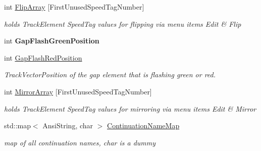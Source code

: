 \begin{DoxyCompactItemize}
\mbox{\label{class_t_track_aa64b2f90dd40e8eafb32c048fe045ae2}} 
int \mbox{\hyperlink{class_t_track_aa64b2f90dd40e8eafb32c048fe045ae2}{Flip\+Array}} \mbox{[}First\+Unused\+Speed\+Tag\+Number\mbox{]}
\begin{DoxyCompactList}\small\item\em holds Track\+Element Speed\+Tag values for \textquotesingle{}flipping\textquotesingle{} via menu items \textquotesingle{}Edit\textquotesingle{} \& \textquotesingle{}Flip\textquotesingle{} \end{DoxyCompactList}\item 
\mbox{\label{class_t_track_ab5d97faddc5d764dc7744adbf3c86f39}} 
int {\bfseries Gap\+Flash\+Green\+Position}
\item 
\mbox{\label{class_t_track_a351b80cfd4c1a83a4f9c460bf7dce54e}} 
int \mbox{\hyperlink{class_t_track_a351b80cfd4c1a83a4f9c460bf7dce54e}{Gap\+Flash\+Red\+Position}}
\begin{DoxyCompactList}\small\item\em Track\+Vector\+Position of the gap element that is flashing green or red. \end{DoxyCompactList}\item 
\mbox{\label{class_t_track_a45717d2ba1186b2ff1188b50447ad22a}} 
int \mbox{\hyperlink{class_t_track_a45717d2ba1186b2ff1188b50447ad22a}{Mirror\+Array}} \mbox{[}First\+Unused\+Speed\+Tag\+Number\mbox{]}
\begin{DoxyCompactList}\small\item\em holds Track\+Element Speed\+Tag values for \textquotesingle{}mirroring\textquotesingle{} via menu items \textquotesingle{}Edit\textquotesingle{} \& \textquotesingle{}Mirror\textquotesingle{} \end{DoxyCompactList}\item 
\mbox{\label{class_t_track_a4cade2b1cabb095c4a52efc729efb44f}} 
std\+::map$<$ Ansi\+String, char $>$ \mbox{\hyperlink{class_t_track_a4cade2b1cabb095c4a52efc729efb44f}{Continuation\+Name\+Map}}
\begin{DoxyCompactList}\small\item\em map of all continuation names, char is a dummy \end{DoxyCompactList}\item 

\end{DoxyCompactItemize}
